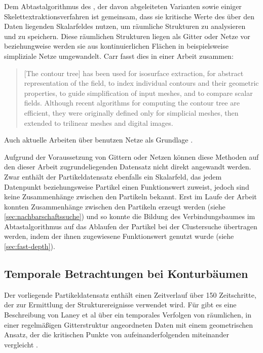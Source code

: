 Dem Abtastalgorithmus des , der davon abgeleiteten Varianten sowie einiger Skelettextraktionsverfahren ist gemeinsam, dass sie kritische Werte des über den Daten liegenden Skalarfeldes nutzen, um räumliche Strukturen zu analysieren und zu speichern. Diese räumlichen Strukturen liegen als Gitter oder Netze vor beziehungweise werden sie aus kontinuierlichen Flächen in beispielsweise simpliziale Netze umgewandelt. Carr fasst dies in einer Arbeit zusammen:
\blockcquote[1]{carr2009representingInterpolantTopology}{[The contour tree] has been used for isosurface extraction, for abstract representation of the field, to index individual contours and their geometric properties, to guide simplification of input meshes, and to compare scalar fields.
Although recent algorithms for computing the contour tree are efficient, they were originally defined only for simplicial meshes, then extended to trilinear meshes and digital images.}
Auch aktuelle Arbeiten über  benutzen Netze als Grundlage \cite{raichel2014avoidingGlobalSort} \cite{acharya2015memoryEfficientCT}.

Aufgrund der Voraussetzung von Gittern oder Netzen können diese Methoden auf den dieser Arbeit zugrundeliegenden Datensatz nicht direkt angewandt werden. Zwar enthält der Partikeldatensatz ebenfalls ein Skalarfeld, das jedem Datenpunkt beziehungsweise Partikel einen Funktionswert zuweist, jedoch sind keine Zusammenhänge zwischen den Partikeln bekannt. Erst im Laufe der Arbeit konnten Zusammenhänge zwischen den Partikeln erzeugt werden (siehe \autoref{sec:nachbarschaftssuche}) und so konnte die Bildung des Verbindungsbaumes im Abtastalgorithmus auf das Ablaufen der Partikel bei der Clustersuche übertragen werden, indem der ihnen zugewiesene Funktionswert genutzt wurde (siehe \autoref{sec:fast-depth}).

\subsection*{Temporale Betrachtungen bei Konturbäumen}\label{sec:related:konturbaumTemporal}
Der vorliegende Partikeldatensatz enthält einen Zeitverlauf über 150 Zeitschritte, der zur Ermittlung der Strukturereignisse verwendet wird. Für  gibt es eine Beschreibung von Laney et al über ein temporales Verfolgen von räumlichen, in einer regelmäßigen Gitterstruktur angeordneten Daten mit einem geometrischen Ansatz, der die kritischen Punkte von aufeinanderfolgenden  miteinander vergleicht \cite[S.~1056]{laney2006turbulentMixingLayer}.

